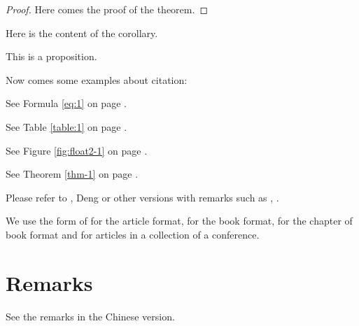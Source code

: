 \documentclass[a4paper,c5size,onecolumn,twoside,nocap,English]{APSart}
\begin{document}
\begin{proof}
Here comes the proof of the theorem.
\end{proof}

\begin{corollary}
Here is the content of the corollary.
\end{corollary}

\begin{proposition}
This is a proposition.
\end{proposition}


Now comes some examples about citation:

\begin{example}
See Formula \eqref{eq:1} on page \pageref{eq:1}.
\end{example}

\begin{example}
See Table \ref{table:1} on page \pageref{table:1}.
\end{example}

\begin{example}
See Figure \ref{fig:float2-1} on page \pageref{fig:float2-1}.
\end{example}

\begin{example}
See Theorem \ref{thm-1} on page \pageref{thm-1}.
\end{example}

\begin{example}
Please refer to , Deng or other versions with remarks such as , .
\end{example}

\begin{example}
We use the form of  for the article format,  for the book format,  for the chapter of book format and \cite{Conference} for articles in a collection of a conference.
\end{example}

\section{Remarks}

\begin{remark}
See the remarks in the Chinese version.
\end{remark}
\end{document}
